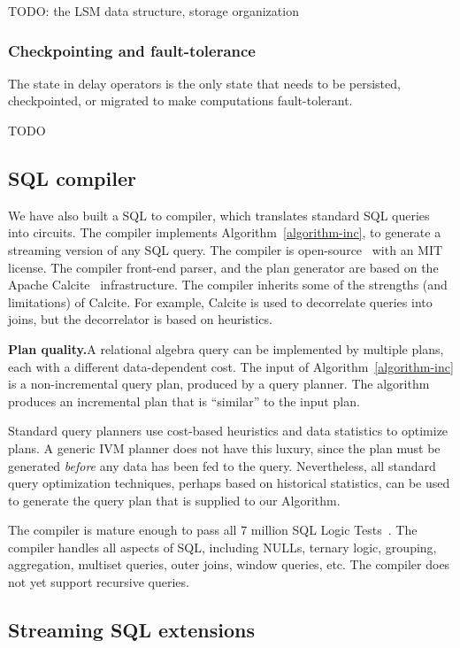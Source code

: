 TODO: the LSM data structure, storage organization

\subsubsection{Checkpointing and fault-tolerance}

The state in delay operators is the only state that needs to be
persisted, checkpointed, or migrated to make \dbsp computations
fault-tolerant.

TODO

\subsection{SQL compiler}

We have also built a SQL to \dbsp compiler, which translates standard
SQL queries into \dbsp circuits.  The compiler implements
Algorithm~\ref{algorithm-inc}, to generate a streaming version of any
SQL query.  The compiler is open-source~\cite{sql-to-dbsp-compiler}
with an MIT license.  The compiler front-end parser, and the plan
generator are based on the Apache Calcite~\cite{begoli-icmd18}
infrastructure.  The compiler inherits some of the strengths (and
limitations) of Calcite.  For example, Calcite is used to decorrelate
queries into joins, but the decorrelator is based on heuristics.

\textbf{Plan quality.}A relational algebra query can be implemented
by multiple plans, each with a different data-dependent cost.  The
input of Algorithm~\ref{algorithm-inc} is a non-incremental query
plan, produced by a query planner.  The algorithm produces an
incremental plan that is ``similar'' to the input plan.

Standard query planners use cost-based heuristics and data statistics
to optimize plans.  A generic IVM planner does not have this luxury,
since the plan must be generated \emph{before} any data has been fed
to the query.  Nevertheless, all standard query optimization
techniques, perhaps based on historical statistics, can be used to
generate the query plan that is supplied to our Algorithm.

The compiler is mature enough to pass all 7 million SQL Logic
Tests~\cite{sqllogictest}.  The compiler handles all aspects of SQL,
including NULLs, ternary logic, grouping, aggregation, multiset
queries, outer joins, window queries, etc.  The compiler does not yet
support recursive queries.

\subsection{Streaming SQL extensions}

